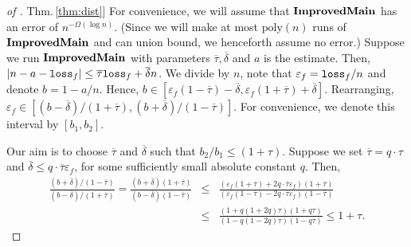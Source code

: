 \documentclass{acmsmall}
\newcommand{\Thm}[1]{\hyperref[thm:#1]{Thm.\,\ref*{thm:#1}}} %
\newcommand{\loss}{{\tt loss}}
\newcommand{\deltapar}{\overline{\delta}}
\newcommand{\taupar}{\overline{\tau}}
\newcommand{\poly}{\textrm{poly}}
\newcommand{\eps}{\varepsilon}
\newcommand{\improvedmain}{{\rm {\bf ImprovedMain}}}
\begin{document}
\begin{proof}[of \Thm{dist}]
For convenience, we will assume that $\improvedmain$ has an error of $n^{-\Omega(\log n)}$.
(Since we will make at most $\poly(n)$ runs of $\improvedmain$ and can union bound, 
we henceforth assume no error.)
Suppose we run $\improvedmain$ with parameters $\taupar,\deltapar$ and $a$ is the estimate.
Then, $|n-a - \loss_f| \leq \taupar \loss_f + \deltapar n$.
We divide by $n$, note that $\eps_f = \loss_f/n$ and denote $b = 1 - a/n$.
Hence, $b \in [\eps_f(1-\taupar) - \deltapar, \eps_f(1+\taupar) + \deltapar]$.
Rearranging, $\eps_f \in [(b-\deltapar)/(1+\taupar),(b+\deltapar)/(1-\taupar)]$.
For convenience, we denote this interval by $[b_1, b_2]$.
%
%

Our aim is to choose $\taupar$ and $\deltapar$ such that $b_2/b_1 \leq (1+\tau)$.
Suppose we set $\taupar = q\cdot\tau$ and $\deltapar \leq q\cdot\taupar\eps_f$,
for some sufficiently small absolute constant $q$. Then,
%
\begin{eqnarray*}
	\frac{(b+\deltapar)/(1-\taupar)}{(b-\deltapar)/(1+\taupar)} 
	= \frac{(b+\deltapar)(1+\taupar)}{(b-\deltapar)(1-\taupar)} 
	& \leq & \frac{(\eps_f(1+\taupar) + 2q\cdot\taupar\eps_f)(1+\taupar)}{(\eps_f(1-\taupar)-2q\cdot\taupar\eps_f)(1-\taupar)} \\
	& \leq & \frac{(1+q(1+2q)\tau)(1+q\tau)}{(1-q(1-2q)\tau)(1-q\tau)} \leq 1+\tau.
\end{eqnarray*}
%
%
%
%
%


\end{proof}
\end{document}
